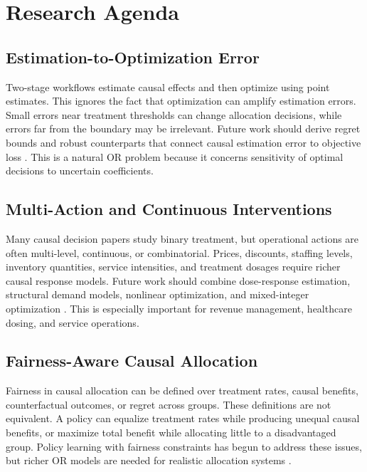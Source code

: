 \documentclass[11pt]{article}
\begin{document}
\section{Research Agenda}
\label{sec:agenda}

\subsection{Estimation-to-Optimization Error}

Two-stage workflows estimate causal effects and then optimize using point estimates. This ignores the fact that optimization can amplify estimation errors. Small errors near treatment thresholds can change allocation decisions, while errors far from the boundary may be irrelevant. Future work should derive regret bounds and robust counterparts that connect causal estimation error to objective loss \citep{kitagawa2018treated,athey2021policy}. This is a natural OR problem because it concerns sensitivity of optimal decisions to uncertain coefficients.

\subsection{Multi-Action and Continuous Interventions}

Many causal decision papers study binary treatment, but operational actions are often multi-level, continuous, or combinatorial. Prices, discounts, staffing levels, inventory quantities, service intensities, and treatment dosages require richer causal response models. Future work should combine dose-response estimation, structural demand models, nonlinear optimization, and mixed-integer optimization \citep{gallego1994optimal,bertsimas2020predictive}. This is especially important for revenue management, healthcare dosing, and service operations.

\subsection{Fairness-Aware Causal Allocation}

Fairness in causal allocation can be defined over treatment rates, causal benefits, counterfactual outcomes, or regret across groups. These definitions are not equivalent. A policy can equalize treatment rates while producing unequal causal benefits, or maximize total benefit while allocating little to a disadvantaged group. Policy learning with fairness constraints has begun to address these issues, but richer OR models are needed for realistic allocation systems \citep{athey2021policy}.
\end{document}
